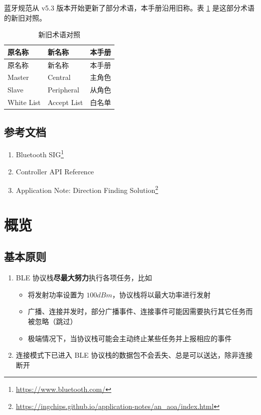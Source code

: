 \documentclass[
  12pt,
]{book}
\providecommand{\tightlist}{%
  \setlength{\itemsep}{0pt}\setlength{\parskip}{0pt}}
\begin{document}
蓝牙规范从 v5.3 版本开始更新了部分术语，本手册沿用旧称。表 \ref{tab:ch0-new-term} 是这部分术语的新旧对照。

\begin{longtable}[]{@{}lll@{}}
\caption{\label{tab:ch0-new-term} 新旧术语对照}\tabularnewline
\toprule
原名称 & 新名称 & 本手册\tabularnewline
\midrule
\endfirsthead
\toprule
原名称 & 新名称 & 本手册\tabularnewline
\midrule
\endhead
Master & Central & 主角色\tabularnewline
Slave & Peripheral & 从角色\tabularnewline
White List & Accept List & 白名单\tabularnewline
\bottomrule
\end{longtable}

\hypertarget{ux53c2ux8003ux6587ux6863}{%
\section{参考文档}\label{ux53c2ux8003ux6587ux6863}}

\begin{enumerate}
\def\labelenumi{\arabic{enumi}.}
\tightlist
\item
  Bluetooth SIG\footnote{\url{https://www.bluetooth.com/}}
\item
  Controller API Reference
\item
  Application Note: Direction Finding Solution\footnote{\url{https://ingchips.github.io/application-notes/an_aoa/index.html}}
\end{enumerate}

\hypertarget{ch-overview}{%
\chapter{概览}\label{ch-overview}}

\hypertarget{ux57faux672cux539fux5219}{%
\section{基本原则}\label{ux57faux672cux539fux5219}}

\begin{enumerate}
\def\labelenumi{\arabic{enumi}.}
\tightlist
\item
  BLE 协议栈\textbf{尽最大努力}执行各项任务，比如

  \begin{itemize}
  \tightlist
  \item
    将发射功率设置为 \(100dBm\)，协议栈将以最大功率进行发射
  \item
    广播、连接并发时，部分广播事件、连接事件可能因需要执行其它任务而被忽略（跳过）
  \item
    极端情况下，当协议栈可能会主动终止某些任务并上报相应的事件
  \end{itemize}
\item
  连接模式下已进入 BLE 协议栈的数据包不会丢失、总是可以送达，除非连接断开
\end{enumerate}
\end{document}
